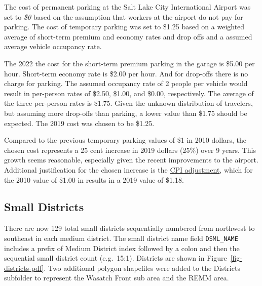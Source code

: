 \documentclass[
  letterpaper,
  DIV=11,
  numbers=noendperiod,
  titlepage=false]{scrreprt}
\begin{document}
The cost of permanent parking at the Salt Lake City International
Airport was set to \emph{\$0} based on the assumption that workers at
the airport do not pay for parking. The cost of temporary parking was
set to \$1.25 based on a weighted average of short-term premium and
economy rates and drop offs and a assumed average vehicle occupancy
rate.

The 2022 the cost for the short-term premium parking in the garage is
\$5.00 per hour. Short-term economy rate is \$2.00 per hour. And for
drop-offs there is no charge for parking. The assumed occupancy rate of
2 people per vehicle would result in per-person rates of \$2.50, \$1.00,
and \$0.00, respectively. The average of the three per-person rates is
\$1.75. Given the unknown distribution of travelers, but assuming more
drop-offs than parking, a lower value than \$1.75 should be expected.
The 2019 cost was chosen to be \$1.25.

Compared to the previous temporary parking values of \$1 in 2010
dollars, the chosen cost represents a 25 cent increase in 2019 dollars
(25\%) over 9 years. This growth seems reasonable, especially given the
recent improvements to the airport. Additional justification for the
chosen increase is the
\href{https://www.bls.gov/data/inflation_calculator.html}{CPI
adjustment}, which for the 2010 value of \$1.00 in results in a 2019
value of \$1.18.

\hypertarget{small-districts}{%
\subsection{Small Districts}\label{small-districts}}

There are now 129 total small districts sequentially numbered from
northwest to southeast in each medium district. The small district name
field \texttt{DSML\_NAME} includes a prefix of Medium District index
followed by a colon and then the sequential small district count
(e.g.~15:1). Districts are shown in Figure~\ref{fig-districts-pdf}. Two
additional polygon shapefiles were added to the Districts subfolder to
represent the Wasatch Front sub area and the REMM area.
\end{document}
